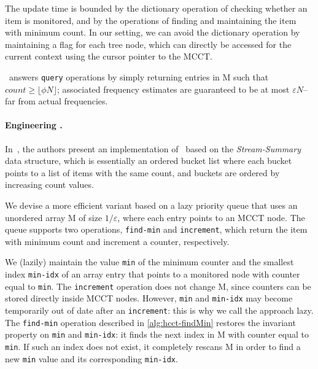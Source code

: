 The update time is bounded by the dictionary operation of checking whether an item is monitored, and by the operations of finding and maintaining the item with minimum count. In our setting, we can avoid the dictionary operation by maintaining a flag for each tree node, which can directly be accessed for the current context using the cursor pointer to the MCCT.

\spacesaving\ answers {\tt query} operations by simply returning entries in M such that $count \geq \lfloor\phi N\rfloor$; associated frequency estimates are guaranteed to be at most $\varepsilon N$--far from actual frequencies.

\paragraph*{Engineering \spacesaving.} In~\cite{Metwally06}, the authors present an implementation of \spacesaving\ based on the {\em Stream-Summary} data structure, which is essentially an ordered bucket list where each bucket points to a list of items with the same count, and buckets are ordered by increasing count values.

\noindent We devise a more efficient variant based on a lazy priority queue that uses an unordered array M of size $1/\varepsilon$, where each entry points to an MCCT node. The queue supports two operations, {\tt find-min} and {\tt increment}, which return the item with minimum count and increment a counter, respectively.

We (lazily) maintain the value {\tt min} of the minimum counter and the smallest index {\tt min-idx} of an array entry that points to a monitored node with counter equal to {\tt min}. The {\tt increment} operation does not change M, since counters can be stored directly inside MCCT nodes. However, {\tt min} and {\tt min-idx} may become temporarily out of date after an {\tt increment}: this is why we call the approach lazy. The {\tt find-min} operation described in \myalgorithm\ref{alg:hcct-findMin} restores the invariant property on {\tt min} and {\tt min-idx}: it finds the next index in M with counter equal to {\tt min}. If such an index does not exist, it completely rescans M in order to find a new {\tt min} value and its corresponding {\tt min-idx}.


